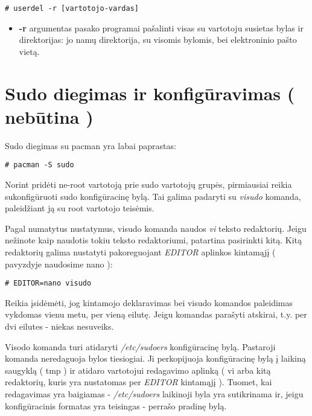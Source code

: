       \begin{verbatim}
# userdel -r [vartotojo-vardas]
      \end{verbatim}

      \begin{itemize}
        \item \textbf{-r} argumentas pasako programai pašalinti visas su
          vartotoju susietas bylas ir direktorijas: jo namų direktorija,
          su visomis bylomis, bei elektroninio pašto vietą.
      \end{itemize}

  \section{Sudo diegimas ir konfigūravimas ( nebūtina )}


    Sudo diegimas su pacman yra labai paprastas:
    
    \begin{verbatim}
# pacman -S sudo
    \end{verbatim}

    Norint pridėti ne-root vartotoją prie sudo vartotojų grupės,
    pirmiausiai reikia sukonfigūruoti sudo konfigūracinę bylą. Tai
    galima padaryti su \textsl{visudo} komanda, paleidžiant ją su root
    vartotojo teisėmis. 

    Pagal numatytus nustatymus, visudo komanda naudos \textsl{vi}
    teksto redaktorių. Jeigu nežinote kaip naudotis tokiu teksto
    redaktoriumi, patartina pasirinkti kitą. Kitą redaktorių galima
    nustatyti pakoreguojant \textsl{EDITOR} aplinkos kintamąjį (
    pavyzdyje naudosime nano ):

    \begin{verbatim}
# EDITOR=nano visudo
    \end{verbatim}

     Reikia įsidėmėti, jog kintamojo deklaravimas
    bei visudo komandos paleidimas vykdomas vienu metu, per vieną
    eilutę. Jeigu komandas parašyti atskirai, t.y. per dvi eilutes -
    niekas nesuveiks. 

    Visodo komanda turi atidaryti \textsl{/etc/sudoers} konfigūracinę
    bylą.  Pastaroji komanda neredaguoja bylos tiesiogiai. Ji
    perkopijuoja konfigūracinę bylą į laikiną saugyklą ( tmp ) ir
    atidaro vartotojui redagavimo aplinką ( vi arba kitą redaktorių,
    kuris yra nustatomas per \textsl{EDITOR} kintamąjį ). Tuomet, kai
    redagavimas yra baigiamas - \textsl{/etc/sudoers} laikinoji byla
    yra sutikrinama ir, jeigu konfigūracinis formatas yra teisingas -
    perrašo pradinę bylą.

